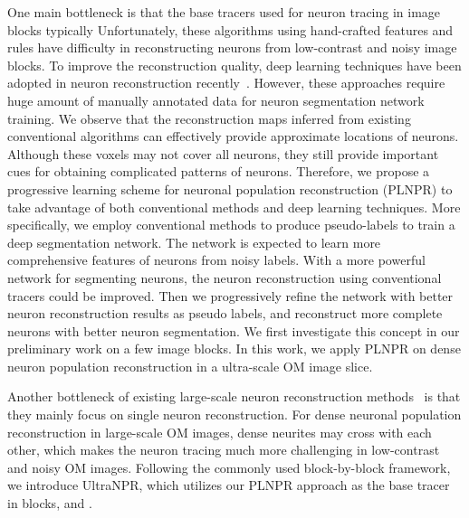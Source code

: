 One main bottleneck is that the base tracers used for neuron tracing in image blocks typically 
Unfortunately, these algorithms using hand-crafted features and rules have difficulty in reconstructing neurons from low-contrast and noisy image blocks.
To improve the reconstruction quality, deep learning techniques have been adopted in neuron reconstruction recently~\cite{Xu2016, Li2017, Zhou2018}. 
However, these approaches require huge amount of manually annotated data for neuron segmentation network training.
%
We observe that the reconstruction maps inferred from existing conventional algorithms can effectively provide approximate locations of neurons. 
Although these voxels may not cover all neurons, they still provide important cues for obtaining complicated patterns of neurons.
Therefore, we propose a progressive learning scheme for neuronal population reconstruction (PLNPR) to take advantage of both conventional methods and deep learning techniques.
More specifically, we employ conventional methods to produce pseudo-labels to train a deep segmentation network. 
The network is expected to learn more comprehensive features of neurons from noisy labels. 
With a more powerful network for segmenting neurons, the neuron reconstruction using conventional tracers could be improved. 
Then we progressively refine the network with better neuron reconstruction results as pseudo labels, and reconstruct more complete neurons with better neuron segmentation.
We first investigate this concept in our preliminary work \cite{Zhao2019} on a few image blocks. 
In this work, we apply PLNPR on dense neuron population reconstruction in a ultra-scale OM image slice. 

Another bottleneck of existing large-scale neuron reconstruction methods~\cite{Zhou2015, Peng2017, Wang2018} is that they mainly focus on single neuron reconstruction. 
%
For dense neuronal population reconstruction in large-scale OM images, dense neurites may cross with each other, which makes the neuron tracing much more challenging in low-contrast and noisy OM images. 
% 
Following the commonly used block-by-block framework, we introduce UltraNPR, which utilizes our PLNPR approach as the base tracer in blocks, and .
%


